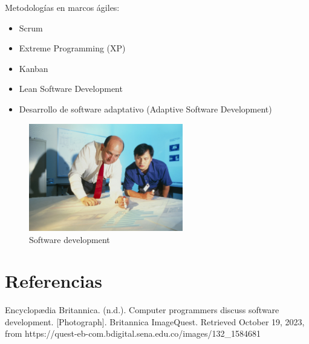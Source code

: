 \documentclass{article}
\theoremstyle{mytheoremstyle}
\theoremstyle{mytheoremstyle}
\theoremstyle{myproblemstyle}
\begin{document}
Metodologías en marcos ágiles:
\begin{itemize}
    \item Scrum
    \item Extreme Programming (XP)
    \item Kanban
    \item Lean Software Development
    \item Desarrollo de software adaptativo (Adaptive Software Development)
\end{itemize}
\begin{figure}
    \centering
    \includegraphics[width=0.6\textwidth]{132_1584681-W.jpg}
    \caption{Software development}
\end{figure}

\section{Referencias}
Encyclopædia Britannica. (n.d.). Computer programmers discuss software development. [Photograph]. Britannica ImageQuest. Retrieved October 19, 2023, from https://quest-eb-com.bdigital.sena.edu.co/images/132_1584681
%
%
\end{document}
